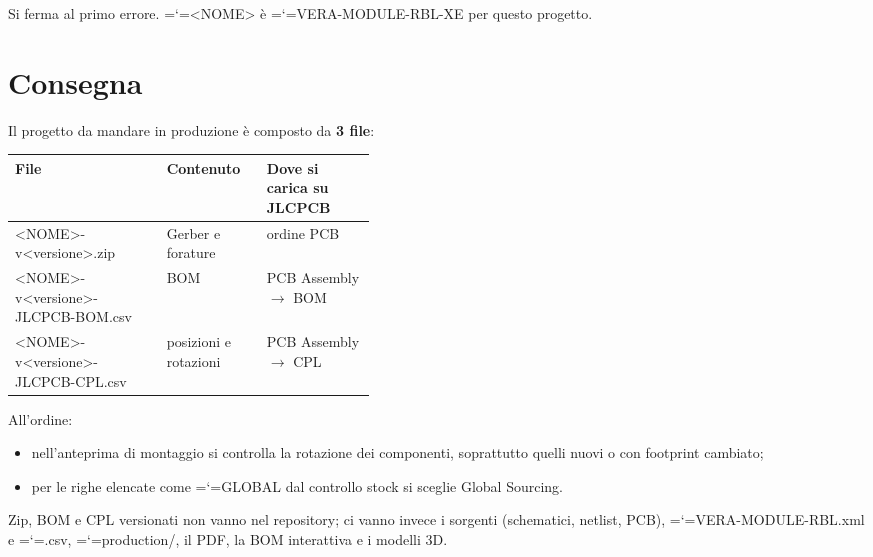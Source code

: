 \documentclass[11pt,a4paper]{article}
\makeatletter
\newcommand{\projname}{VERA-MODULE-RBL-XE}
\newcommand{\file}[1]{{\ttfamily\hyphenchar\font=`\-\relax\language=\l@nohyphenation #1}}
\makeatother
\begin{document}
Si ferma al primo errore. \file{<NOME>} è \file{\projname} per questo progetto.

\section{Consegna}

Il progetto da mandare in produzione è composto da \textbf{3 file}:

\begin{center}
\begin{tabularx}{\linewidth}{>{\raggedright\arraybackslash\ttfamily\small}p{0.42\linewidth} L L}
\toprule
\normalfont\normalsize\textbf{File} & \textbf{Contenuto} & \textbf{Dove si carica su JLCPCB} \\
\midrule
<NOME>-v<versione>.zip             & Gerber e forature     & ordine PCB \\
<NOME>-v<versione>-JLCPCB-BOM.csv  & BOM                   & PCB Assembly $\rightarrow$ BOM \\
<NOME>-v<versione>-JLCPCB-CPL.csv  & posizioni e rotazioni & PCB Assembly $\rightarrow$ CPL \\
\bottomrule
\end{tabularx}
\end{center}

All'ordine:

\begin{itemize}[leftmargin=*]
  \item nell'anteprima di montaggio si controlla la rotazione dei componenti,
        soprattutto quelli nuovi o con footprint cambiato;
  \item per le righe elencate come \file{GLOBAL} dal controllo stock si sceglie
        Global Sourcing.
\end{itemize}

Zip, BOM e CPL versionati non vanno nel repository; ci vanno invece i sorgenti
(schematici, netlist, PCB), \file{VERA-MODULE-RBL.xml} e \file{.csv},
\file{production/}, il PDF, la BOM interattiva e i modelli 3D.
\end{document}
